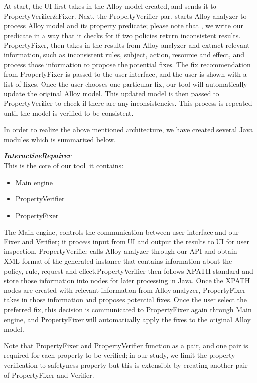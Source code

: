 \documentclass{acm_proc_article-sp}
\begin{document}
At start, the UI first takes in the Alloy model created, and sends it to PropertyVerifier\&Fixer. Next, the PropertyVerifier part starts Alloy analyzer to process Alloy model and its property predicate;  please note that , we write our predicate in a way that it checks for if two policies return inconsistent results. PropertyFixer, then takes in the results from Alloy analyzer and extract relevant information, such as inconsistent rules, subject, action, resource and effect, and process those information to propose the potential fixes. The fix recommendation from PropertyFixer is passed to the user interface, and the user is shown with a list of fixes. Once the user chooses one particular fix, our tool will automatically update the original Alloy model. This updated model is then passed to PropertyVerifier to check if there are any inconsistencies. This process is repeated until the model is verified to be consistent.

In order to realize the above mentioned architecture, we have created several Java modules which is summarized below.

\textbf{\emph{InteractiveRepairer}}\\
This is the core of our tool, it contains:
\begin{itemize}
\item Main engine
\item PropertyVerifier
\item PropertyFixer
\end{itemize}
The Main engine, controls the communication between user interface and our Fixer and Verifier; it process input from UI and output the results to UI for user inspection. PropertyVerifier calls Alloy analyzer through our API and obtain XML format of the generated instance that contains information about the policy, rule, request and effect.PropertyVerifier then follows XPATH standard and store those information into nodes for later processing in Java. Once the XPATH nodes are created with relevant information from Alloy analyzer, PropertyFixer takes in those information and proposes potential fixes. Once the user select the preferred fix, this decision is communicated to PropertyFixer again through Main engine, and PropertyFixer will automatically apply the fixes to the original Alloy model.

Note that PropertyFixer and PropertyVerifier function as a pair, and one pair is required for each property to be verified; in our study, we limit the property verification to safetyness property but this is extensible by creating another pair of PropertyFixer and Verifier.
\end{document}

